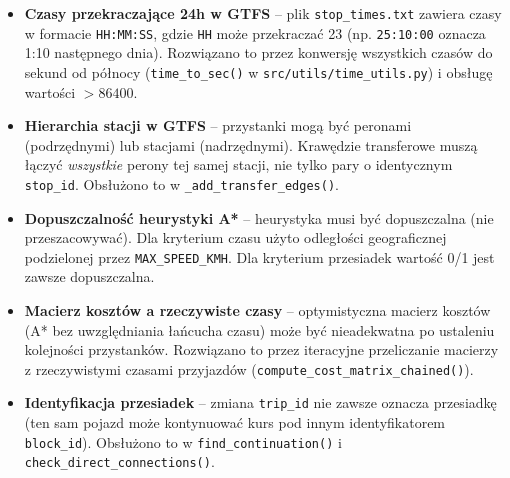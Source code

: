 \documentclass[12pt,a4paper]{article}
\begin{document}
\begin{itemize}
    \item \textbf{Czasy przekraczające 24h w GTFS} -- plik \texttt{stop\_times.txt}
          zawiera czasy w formacie \texttt{HH:MM:SS}, gdzie \texttt{HH} może
          przekraczać 23 (np. \texttt{25:10:00} oznacza 1:10 następnego dnia).
          Rozwiązano to przez konwersję wszystkich czasów do sekund od północy
          (\texttt{time\_to\_sec()} w \texttt{src/utils/time\_utils.py}) i obsługę
          wartości $> 86400$.

    \item \textbf{Hierarchia stacji w GTFS} -- przystanki mogą być peronami
          (podrzędnymi) lub stacjami (nadrzędnymi). Krawędzie transferowe muszą
          łączyć \emph{wszystkie} perony tej samej stacji, nie tylko pary o
          identycznym \texttt{stop\_id}. Obsłużono to w \texttt{\_add\_transfer\_edges()}.

    \item \textbf{Dopuszczalność heurystyki A*} -- heurystyka musi być dopuszczalna
          (nie przeszacowywać). Dla kryterium czasu użyto odległości geograficznej
          podzielonej przez \texttt{MAX\_SPEED\_KMH}. Dla kryterium przesiadek wartość
          0/1 jest zawsze dopuszczalna.

    \item \textbf{Macierz kosztów a rzeczywiste czasy} -- optymistyczna macierz
          kosztów (A* bez uwzględniania łańcucha czasu) może być nieadekwatna po
          ustaleniu kolejności przystanków. Rozwiązano to przez iteracyjne przeliczanie
          macierzy z rzeczywistymi czasami przyjazdów (\texttt{compute\_cost\_matrix\_chained()}).

    \item \textbf{Identyfikacja przesiadek} -- zmiana \texttt{trip\_id} nie zawsze
          oznacza przesiadkę (ten sam pojazd może kontynuować kurs pod innym
          identyfikatorem \texttt{block\_id}). Obsłużono to w \texttt{find\_continuation()}
          i \texttt{check\_direct\_connections()}.
\end{itemize}
\end{document}
